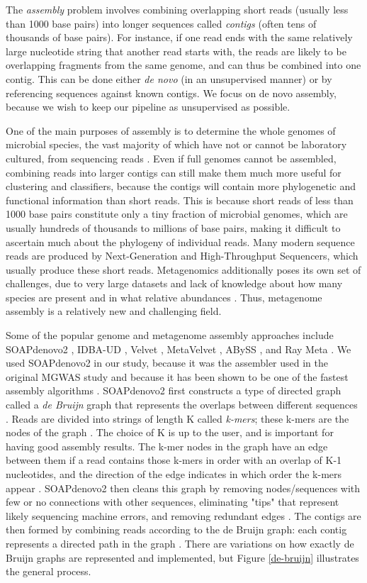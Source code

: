 The \emph{assembly} problem involves combining overlapping short reads (usually less than 1000 base pairs) into longer sequences called \emph{contigs} (often tens of thousands of base pairs). For instance, if one read ends with the same relatively large nucleotide string that another read starts with, the reads are likely to be overlapping fragments from the same genome, and can thus be combined into one contig. This can be done either \emph{de novo} (in an unsupervised manner) or by referencing sequences against known contigs. We focus on de novo assembly, because we wish to keep our pipeline as unsupervised as possible. 

One of the main purposes of assembly is to determine the whole genomes of microbial species, the vast majority of which have not or cannot be laboratory cultured, from sequencing reads \cite{zerbino08}. Even if full genomes cannot be assembled, combining reads into larger contigs can still make them much more useful for clustering and classifiers, because the contigs will contain more phylogenetic and functional information than short reads. This is because short reads of less than 1000 base pairs constitute only a tiny fraction of microbial genomes, which are usually hundreds of thousands to millions of base pairs, making it difficult to ascertain much about the phylogeny of individual reads. Many modern sequence reads are produced by Next-Generation and High-Throughput Sequencers, which usually produce these short reads. Metagenomics additionally poses its own set of challenges, due to very large datasets and lack of knowledge about how many species are present and in what relative abundances \cite{namiki12}. Thus, metagenome assembly is a relatively new and challenging field.

Some of the popular genome and metagenome assembly approaches include SOAPdenovo2 \cite{luo12}, IDBA-UD \cite{peng12}, Velvet \cite{zerbino08}, MetaVelvet \cite{namiki12}, ABySS \cite{simpson09}, and Ray Meta \cite{boisvert12}. We used SOAPdenovo2 in our study, because it was the assembler used in the original MGWAS study \cite{qin041012} and because it has been shown to be one of the fastest assembly algorithms \cite{peng12}. SOAPdenovo2 first constructs a type of directed graph called a \emph{de Bruijn} graph that represents the overlaps between different sequences \cite{li10}. Reads are divided into strings of length K called \emph{k-mers}; these k-mers are the nodes of the graph \cite{zerbino08}. The choice of K is up to the user, and is important for having good assembly results. The k-mer nodes in the graph have an edge between them if a read contains those k-mers in order with an overlap of K-1 nucleotides, and the direction of the edge indicates in which order the k-mers appear \cite{zerbino08}. SOAPdenovo2 then cleans this graph by removing nodes/sequences with few or no connections with other sequences, eliminating "tips" that represent likely sequencing machine errors, and removing redundant edges \cite{li10}. The contigs are then formed by combining reads according to the de Bruijn graph: each contig represents a directed path in the graph \cite{zerbino08}. There are variations on how exactly de Bruijn graphs are represented and implemented, but Figure \ref{de-bruijn} illustrates the general process.

